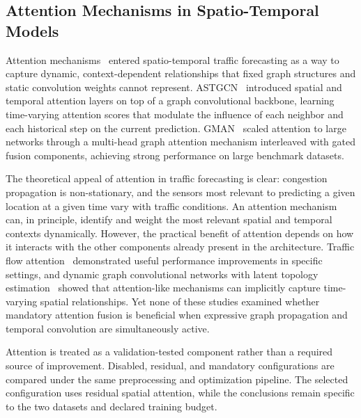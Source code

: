 \documentclass[fleqn,10pt]{wlscirep}
\newenvironment{changedcontent}{\color{changeblue}}{}
\begin{document}
\subsection{Attention Mechanisms in Spatio-Temporal Models}

Attention mechanisms~\cite{vaswani2017attention} entered
spatio-temporal traffic forecasting as a way to capture
dynamic, context-dependent relationships that fixed graph structures
and static convolution weights cannot represent. ASTGCN~\cite{guo2019astgcn}
introduced spatial and temporal attention layers on top of a graph
convolutional backbone, learning time-varying attention scores that
modulate the influence of each neighbor and each historical step on
the current prediction. GMAN~\cite{zheng2020gman,zheng2020gmanfull}
scaled attention to large networks through a multi-head graph
attention mechanism interleaved with gated fusion components, achieving
strong performance on large benchmark datasets.

The theoretical appeal of attention in traffic forecasting is clear:
congestion propagation is non-stationary, and the sensors most
relevant to predicting a given location at a given time vary with
traffic conditions. An attention mechanism can, in principle, identify
and weight the most relevant spatial and temporal contexts dynamically.
However, the practical benefit of attention depends on how it interacts
with the other components already present in the architecture.
Traffic flow attention~\cite{zhang2023stagcn} demonstrated useful
performance improvements in specific settings, and dynamic graph
convolutional networks with latent topology estimation~\cite{han2021dynamicgraph}
showed that attention-like mechanisms can implicitly capture
time-varying spatial relationships. Yet none of these studies
examined whether mandatory attention fusion is beneficial when
expressive graph propagation and temporal convolution are simultaneously
active.

\begin{changedcontent}
Attention is treated as a validation-tested component rather than a required
source of improvement. Disabled, residual, and mandatory configurations are
compared under the same preprocessing and optimization pipeline. The selected
configuration uses residual spatial attention, while the conclusions remain
specific to the two datasets and declared training budget.
\end{changedcontent}
\end{document}
